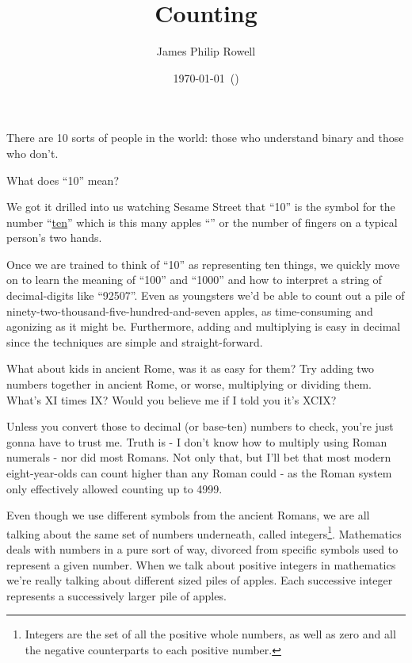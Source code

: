\documentclass{article}
\title{\vspace{-1.5cm}Counting}
\author{James Philip Rowell}
\date{\vspace{-0.5cm}\footnotesize\today\ (\jprVersion)} %
\begin{document}
\maketitle
\begin{em}
\centerline{\small{}There are 10 sorts of people in the world: those who understand binary and those who don't.}
\end{em}
\bigskip

What does ``10'' mean?

We got it drilled into us watching Sesame Street that ``10'' is the symbol for the number
``\href{https://youtu.be/YcRBEqq-tGY?list=PLjBV4gvZoIcwHfhAWBmP6i7vEuqU6Q6vE}{ten}''
which is this many apples
``\faApple{}\faApple{}\faApple{}\faApple{}\faApple{}\faApple{}\faApple{}\faApple{}\faApple{}\faApple{}''
or the number of fingers on a typical person's two hands.

Once we are trained to think
of ``10'' as representing ten things, we quickly move on to learn the meaning of ``100'' and ``1000''
and how to interpret a string of decimal-digits 
like ``92507''.
Even as youngsters we'd
be able to count out a pile of
ninety-two-thousand-five-hundred-and-seven apples,
as time-consuming and agonizing as it might be.
Furthermore, adding and multiplying is easy in 
decimal since the techniques are simple and straight-forward.

What about kids in ancient Rome, was it as easy for them?
Try adding two numbers together in ancient Rome, or worse,
multiplying or dividing them.
What's XI times IX? Would you believe me if I told
you it's XCIX?

Unless you convert those to decimal (or base-ten) numbers to check,
you're just gonna have to trust me.
Truth is - I don't know how to multiply using Roman
numerals - nor did most Romans. Not only that,
but I'll bet that most modern eight-year-olds 
can count higher than any Roman could - as the
Roman system only effectively allowed counting up to 4999.

Even though we
use different symbols
from
the ancient Romans, we are all
talking about the same set of numbers underneath,
called integers\footnote{Integers are 
the set of all the positive whole numbers, as well as zero and all the negative counterparts to each positive number.
}.
Mathematics deals with numbers in a pure sort of way, divorced from specific symbols
used to represent a given number.
When we talk about positive integers in mathematics
we're really talking about different sized piles of apples.
Each successive integer
represents a successively larger pile of apples.
\end{document}
